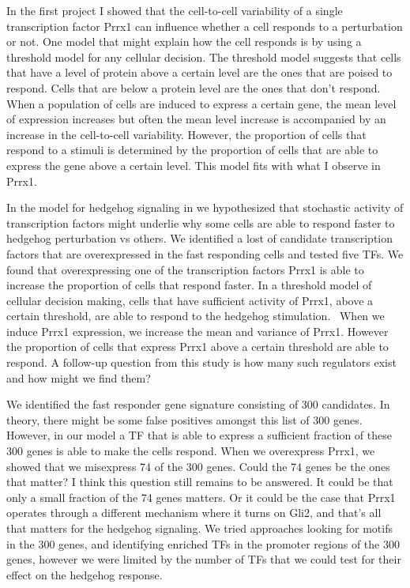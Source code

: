 In the first project I showed that the cell-to-cell variability of a single transcription factor Prrx1 can influence whether a cell responds to a perturbation or not. One model that might explain how the cell responds is by using a threshold model for any cellular decision. The threshold model suggests that cells that have a level of protein above a certain level are the ones that are poised to respond. Cells that are below a protein level are the ones that don't respond. When a population of cells are induced to express a certain gene, the mean level of expression increases but often the mean level increase is accompanied by an increase in the cell-to-cell variability. However, the proportion of cells that respond to a stimuli is determined by the proportion of cells that are able to express the gene above a certain level. This model fits with what I observe in Prrx1.

In the model for hedgehog signaling in \label{Chap:hedgehog} we hypothesized that stochastic activity of transcription factors might underlie why some cells are able to respond faster to hedgehog perturbation vs others. We identified a lost of candidate transcription factors that are overexpressed in the fast responding cells and tested five TFs. We found that overexpressing one of the transcription factors Prrx1 is able to increase the proportion of cells that respond faster. In a threshold model of cellular decision making, cells that have sufficient activity of Prrx1, above a certain threshold, are able to respond to the hedgehog stimulation.  When we induce Prrx1 expression, we increase the mean and variance of Prrx1. However the proportion of cells that express Prrx1 above a certain threshold are able to respond. A follow-up question from this study is how many such regulators exist and how might we find them?

We identified the fast responder gene signature consisting of 300 candidates. In theory, there might be some false positives amongst this list of 300 genes. However, in our model a TF that is able to express a sufficient fraction of these 300 genes is able to make the cells respond. When we overexpress Prrx1, we showed that we misexpress 74 of the 300 genes. Could the 74 genes be the ones that matter? I think this question still remains to be answered. It could be that only a small fraction of the 74 genes matters. Or it could be the case that Prrx1 operates through a different mechanism where it turns on Gli2, and that's all that matters for the hedgehog signaling. We tried approaches looking for motifs in the 300 genes, and identifying enriched TFs in the promoter regions of the 300 genes, however we were limited by the number of TFs that we could test for their effect on the hedgehog response. 

